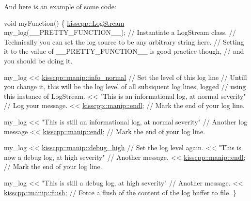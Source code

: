 And here is an example of some code\-: 
\begin{DoxyCode}
\textcolor{keywordtype}{void} myFunction()
\{
  \hyperlink{classkisscpp_1_1_log_stream}{kisscpp::LogStream} my\_log(\_\_PRETTY\_FUNCTION\_\_);                    \textcolor{comment}{// Instantiate a
       LogStream class.}
                                                                     \textcolor{comment}{// Technically you can set the log
       source to be any arbitrary string here.}
                                                                     \textcolor{comment}{// Setting it to the value of
       \_\_PRETTY\_FUNCTION\_\_ is good practice though,}
                                                                     \textcolor{comment}{// and you should be doing it.}

  my\_log << \hyperlink{namespacekisscpp_1_1manip_aee465aa1a8d15e1750422696f7d3dc81}{kisscpp::manip::info\_normal}                              \textcolor{comment}{// Set the
       level of this log line}
                                                                     \textcolor{comment}{// Untill you change it, this will be
       the log level of all subsiquent log lines, logged}
                                                                     \textcolor{comment}{// using this instance of LogStream.}
         << \textcolor{stringliteral}{"This is an informational log, at normal severity"}       \textcolor{comment}{// Log your message.}
         << \hyperlink{namespacekisscpp_1_1manip_ad682f16cb474bc7ff2c991ad2c45db66}{kisscpp::manip::endl};                                    \textcolor{comment}{// Mark the end of
       your log line.}

  my\_log << \textcolor{stringliteral}{"This is still an informational log, at normal severity"} \textcolor{comment}{// Another log message}
         << \hyperlink{namespacekisscpp_1_1manip_ad682f16cb474bc7ff2c991ad2c45db66}{kisscpp::manip::endl};                                    \textcolor{comment}{// Mark the end of
       your log line.}

  my\_log << \hyperlink{namespacekisscpp_1_1manip_aaf086b98ab45fa8c08557762e019afb7}{kisscpp::manip::debug\_high}                               \textcolor{comment}{// Set the
       log level again.}
         << \textcolor{stringliteral}{"This is now a debug log, at high severity"}              \textcolor{comment}{// Another message.}
         << \hyperlink{namespacekisscpp_1_1manip_ad682f16cb474bc7ff2c991ad2c45db66}{kisscpp::manip::endl};                                    \textcolor{comment}{// Mark the end of
       your log line.}

  my\_log << \textcolor{stringliteral}{"This is still a debug log, at high severity"}            \textcolor{comment}{// Another message.}
         << \hyperlink{namespacekisscpp_1_1manip_a416806b7a937a2437ffadb9b523e1cf3}{kisscpp::manip::flush};                                   \textcolor{comment}{// Force a flush
       of the content of the log buffer to file.}
\}
\end{DoxyCode}


